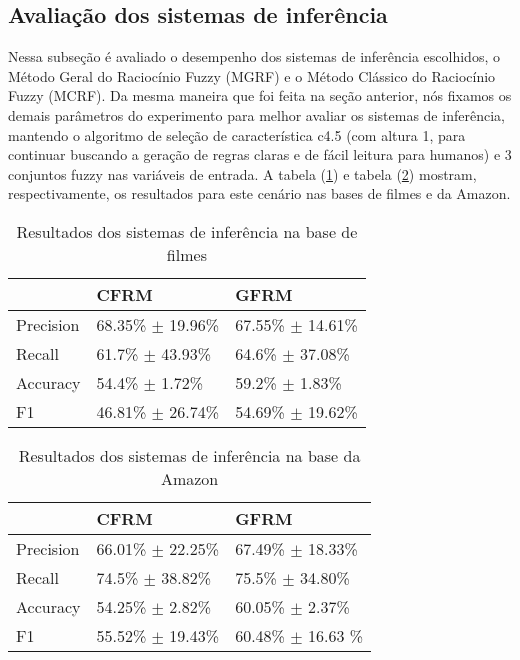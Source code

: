 \subsection{Avaliação dos sistemas de inferência}

Nessa subseção é avaliado o desempenho dos sistemas de inferência escolhidos, o Método Geral do Raciocínio Fuzzy (MGRF) e o Método Clássico do Raciocínio Fuzzy (MCRF). Da mesma maneira que foi feita na seção anterior, nós fixamos os demais parâmetros do experimento para melhor avaliar os sistemas de inferência, mantendo o algoritmo de seleção de característica c4.5 (com altura 1, para continuar buscando a geração de regras claras e de fácil leitura para humanos) e 3 conjuntos fuzzy nas variáveis de entrada. A tabela (\ref{table:movies2}) e tabela (\ref{table:amazon2}) mostram, respectivamente, os resultados para este cenário nas bases de filmes e da Amazon.

\begin{table}[!h]
    \begin{tabular}{lll}
 	~         			& CFRM 								& GFRM \\ \hline
    Precision 		& 68.35\% $\pm$ 19.96\%   & 67.55\% $\pm$ 14.61\%    \\
    Recall    		& 61.7\% $\pm$ 43.93\%   & 64.6\% $\pm$ 37.08\%   \\
    Accuracy  		& 54.4\% $\pm$ 1.72\%    	& 59.2\% $\pm$ 1.83\%    \\
    F1  					& 46.81\% $\pm$ 26.74\% & 54.69\% $\pm$ 19.62\%    \\
    \end{tabular}
    \caption{Resultados dos sistemas de inferência na base de filmes}
	\label{table:movies2}
\end{table}

\begin{table}[!h]
    \begin{tabular}{lll}
    ~         			& CFRM 									& GFRM \\ \hline
    Precision 		& 66.01\% $\pm$ 22.25\%    	& 67.49\% $\pm$ 18.33\%    \\
    Recall    		& 74.5\% $\pm$ 38.82\%    	& 75.5\% $\pm$ 34.80\%    \\
    Accuracy  		& 54.25\% $\pm$ 2.82\%    		& 60.05\% $\pm$ 2.37\%   \\
    F1  					& 55.52\% $\pm$ 19.43\%   	& 60.48\% $\pm$ 16.63	\%   \\
    \end{tabular}
    \caption{Resultados dos sistemas de inferência na base da Amazon}
	\label{table:amazon2}
\end{table}

